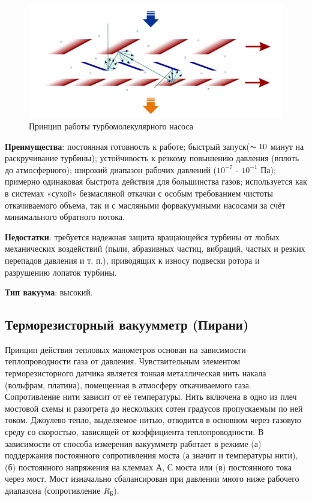 \documentclass[a4paper, 12pt]{article} %
\begin{document}
\begin{figure}[h]
    \centering
    \includegraphics[width = 10.5 cm]{Принцип ТМН}
    \caption{Принцип работы турбомолекулярного насоса}
    \label{fig:vac}
\end{figure}

\textbf{Преимущества}: постоянная готовность к работе; быстрый запуск($\thicksim 10$ минут на раскручивание турбины); устойчивость к резкому повышению давления (вплоть до атмосферного); широкий диапазон рабочих давлений ($10^{-7}$ - $10^{-1}$ Па); примерно одинаковая быстрота действия для большинства газов; используется как в системах «сухой» безмасляной откачки с особым требованием чистоты откачиваемого объема, так и с масляными форвакуумными насосами за счёт минимального обратного потока.

\textbf{Недостатки}: требуется надежная защита вращающейся турбины от любых механических воздействий (пыли, абразивных частиц, вибраций, частых и резких перепадов давления и т. п.), приводящих к износу подвески ротора и разрушению лопаток турбины.

\textbf{Тип вакуума}: высокий.


\subsection{Терморезисторный вакуумметр (Пирани)}

Принцип действия тепловых манометров основан на зависимости
теплопроводности газа от давления. Чувствительным элементом терморезисторного датчика является тонкая металлическая нить накала (вольфрам, платина), помещенная в атмосферу откачиваемого газа. Сопротивление нити зависит от её температуры. Нить включена в одно из плеч мостовой схемы и разогрета до нескольких сотен градусов пропускаемым по ней током. Джоулево тепло, выделяемое нитью, отводится в основном через газовую среду со скоростью, зависящей от коэффициента теплопроводности. В зависимости от способа измерения вакуумметр работает в режиме (а) поддержания постоянного сопротивления моста (а значит и температуры нити), (б) постоянного напряжения на клеммах $А$, $С$ моста или (в) постоянного тока через мост. Мост изначально сбалансирован при давлении много ниже рабочего диапазона (сопротивление $R_{\text{Б}}$).
\end{document}
